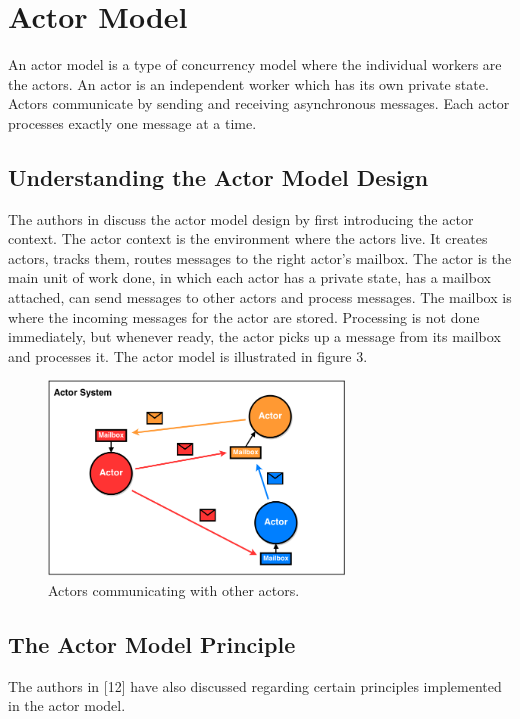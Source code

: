 \section{Actor Model\label{sec:actor}}
An actor model is a type of concurrency model where the individual workers are the actors. An actor is an independent worker which has its own private state. Actors communicate by sending and receiving asynchronous messages. Each actor processes exactly one message at a time.

\subsection{Understanding the Actor Model Design}
The authors in \cite{8316391} discuss the actor model design by first introducing the actor context. The actor context is the environment where the actors live. It creates actors, tracks them, routes messages to the right actor's mailbox.  The actor is the main unit of work done, in which each actor has a private state, has a mailbox attached, can send messages to other actors and process messages. The mailbox is where the incoming messages for the actor are stored. Processing is not done immediately, but whenever ready, the actor picks up a message from its mailbox and processes it. 
The actor model is illustrated in figure 3. 
\begin{figure}[h]
    \centering
    \includegraphics[width=0.7\textwidth]{actor.png}
    \caption{Actors communicating with other actors.}
    \label{fig:actor}
\end{figure}
\subsection{The Actor Model Principle}
The authors in [12] have also discussed regarding certain principles implemented in the actor model.

